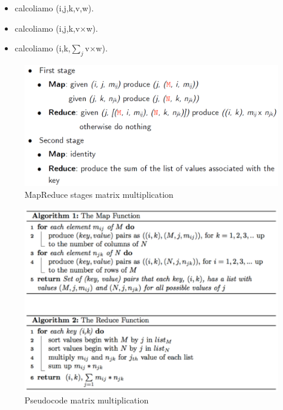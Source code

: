 \documentclass{article}
\begin{document}
\begin{appendices}
\begin{itemize}
    \item calcoliamo (i,j,k,v,w).
    \item calcoliamo (i,j,k,v$\times$w).
    \item calcoliamo (i,k,$\sum_j$v$\times$w).  
\end{itemize}
\begin{figure}[H]
    \centering
    \includegraphics[scale=0.5]{img/matrixmultiplication1.PNG}
    \caption{MapReduce stages matrix multiplication}
\end{figure}
\begin{figure}[H]
    \centering
    \includegraphics[scale=0.5]{img/matrixmultiplication2.PNG}
    \caption{Pseudocode matrix multiplication}
\end{figure}


\end{appendices}
\end{document}
